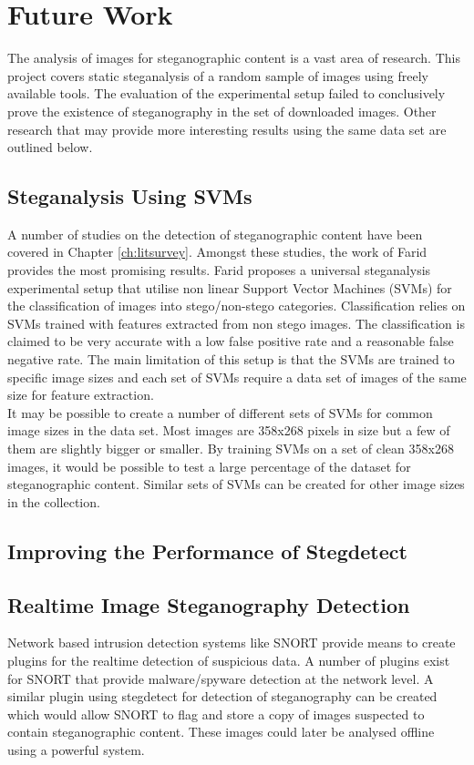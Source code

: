 \chapter{Future Work}
\label{ch:futurework}
The analysis of images for steganographic content is a vast 
area of research. This project covers static steganalysis of
a random sample of images using freely available tools. The evaluation
of the experimental setup failed to conclusively prove the existence of
steganography in the set of downloaded images. Other research that may
provide more interesting results using the same data set are outlined
below.
\section{Steganalysis Using SVMs}
\label{sec:futuresvm}
A number of studies on the detection of steganographic content have been
covered in Chapter \ref{ch:litsurvey}. Amongst these studies, the work
of Farid \cite{farid2002detecting} provides the most promising results.
Farid proposes a universal steganalysis experimental setup that utilise
non linear Support Vector Machines (SVMs) for the classification of
images into stego/non-stego categories. Classification relies on
SVMs trained with features extracted from non stego images. The classification is claimed to
be very accurate with a low false positive rate and a
reasonable false negative rate. The main limitation of this
setup is that the SVMs are trained to specific image sizes and each set
of SVMs require a data set of images of the same size for feature extraction.
\\
It may be possible to create a number of different sets of SVMs for
common image sizes in the data set. Most images are 358x268 pixels in
size but a few of them are slightly bigger or smaller. By training SVMs
on a set of clean 358x268 images, it would be possible to test a large
percentage of the dataset for steganographic content. Similar sets of SVMs can be created for other
image sizes in the collection.
\section{Improving the Performance of Stegdetect}
\label{sec:futurestegdetect}


\section{Realtime Image Steganography Detection}
\label{sec:futurereal}
Network based intrusion detection systems like SNORT provide means to
create plugins for the realtime detection of suspicious data. A number
of plugins exist for SNORT that provide malware/spyware detection at the
network level. A similar plugin using stegdetect for detection of
steganography can be created which would allow SNORT to flag and
store a copy of images suspected to contain steganographic content.
These images could later be analysed offline using a powerful system. 
